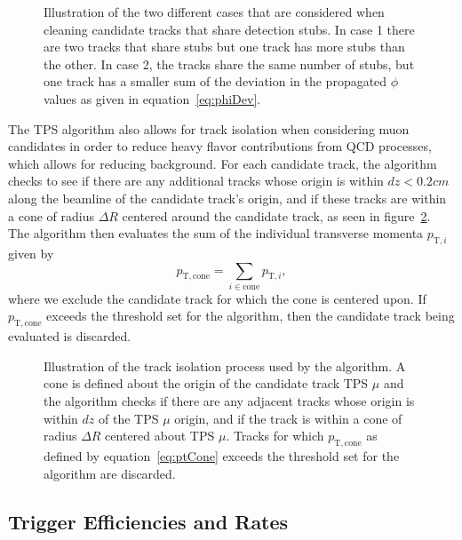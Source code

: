 \begin{figure}[htbp]
  \centering
  
  \caption{Illustration of the two different cases that are considered when cleaning candidate tracks that share detection stubs. In case 1 there are two tracks that share stubs but one track has more stubs than the other. In case 2, the tracks share the same number of stubs, but one track has a smaller sum of the deviation in the propagated $\phi$ values as given in equation~\ref{eq:phiDev}.}
  \label{fig:clean}
\end{figure}

The TPS algorithm also allows for track isolation when considering muon candidates in order to reduce heavy flavor contributions from QCD processes, which allows for reducing background.
For each candidate track, the algorithm checks to see if there are any additional tracks whose origin is within $dz<0.2\unit{cm}$ along the beamline of the candidate track's origin, and if these tracks are within a cone of radius $\Delta R$ centered around the candidate track, as seen in figure~\ref{fig:isol}.
The algorithm then evaluates the sum of the individual transverse momenta $p_{\mathrm{T},i}$ given by
\begin{equation}\label{eq:ptCone}
  p_\mathrm{T,cone}=\sum_{i\in\mathrm{cone}}p_{\mathrm{T},i},
\end{equation}
where we exclude the candidate track for which the cone is centered upon.
If $p_\mathrm{T,cone}$ exceeds the threshold set for the algorithm, then the candidate track being evaluated is discarded.

\begin{figure}[htbp]
  \centering
  
  \caption{Illustration of the track isolation process used by the algorithm. A cone is defined about the origin of the candidate track TPS $\mu$ and the algorithm checks if there are any adjacent tracks whose origin is within $dz$ of the TPS $\mu$ origin, and if the track is within a cone of radius $\Delta R$ centered about TPS $\mu$. Tracks for which $p_\mathrm{T,cone}$ as defined by equation~\ref{eq:ptCone} exceeds the threshold set for the algorithm are discarded.}
  \label{fig:isol}
\end{figure}

\subsection{Trigger Efficiencies and Rates}
\label{subsec:effRates}

